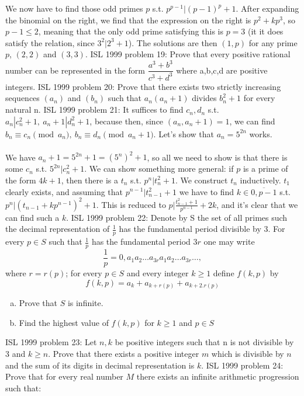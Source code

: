 We now have to find those odd primes $p$ s.t. $p^{p-1}|(p-1)^p+1$. After expanding the binomial on the right, we find that the expression on the right is $p^2+kp^3$, so $p-1\le 2$, meaning that the only odd prime satisfying this is $p=3$ (it it does satisfy the relation, since $3^2|2^3+1$). The solutions are then $(1,p)$ for any prime $p$, $(2,2)$ and $(3,3)$. 
ISL 1999 problem 19:  Prove that every positive rational number can be represented in the form $\dfrac{a^3+b^3}{c^3+d^3}$ where a,b,c,d are positive integers. 
ISL 1999 problem 20:  Prove that there exists two strictly increasing sequences $(a_n)$ and $(b_n)$ such that $a_n(a_n+1)$ divides $b^2_n+1$ for every natural n. 
ISL 1999 problem 21:  It suffices to find $c_n,d_n$ s.t. $a_n|c_n^2+1,\ a_n+1|d_n^2+1$, because then, since $(a_n,a_n+1)=1$, we can find $b_n\equiv c_n\pmod {a_n},\ b_n\equiv d_n\pmod{a_n+1}$. Let's show that $a_n=5^{2n}$ works. \\\\
We have $a_n+1=5^{2n}+1=(5^n)^2+1$, so all we need to show is that there is some $c_n$ s.t. $5^{2n}|c_n^2+1$. We can show something more general: if $p$ is a prime of the form $4k+1$, then there is a $t_n$ s.t. $p^n|t_n^2+1$. We construct $t_n$ inductively. $t_1$ clearly exists, and assuming that $p^{n-1}|t_{n-1}^2+1$ we have to find $k\in\overline{0,p-1}$ s.t. $p^n|(t_{n-1}+kp^{n-1})^2+1$. This is reduced to $p|\frac{t_{n-1}^2+1}{p^{n-1}}+2k$, and it's clear that we can find such a $k$. 
ISL 1999 problem 22:  Denote by S the set of all primes such the decimal representation of $\frac{1}{p}$ has the fundamental period divisible by 3. For every $p \in S$ such that $\frac{1}{p}$ has the fundamental period $3r$ one may write
\[ \frac{1}{p}=0,a_1a_2\ldots a_{3r}a_1a_2 \ldots a_{3r} \ldots , \]
where $r=r(p)$; for every $p \in S$ and every integer $k \geq 1$ define $f(k,p)$ by
\[ f(k,p)= a_k+a_{k+r(p)}+a_{k+2.r(p)} \]
\begin{enumerate}[a)]
  \item Prove that $S$ is infinite.
  \item Find the highest value of $f(k,p)$ for $k \geq 1$ and $p \in S$
\end{enumerate} 
ISL 1999 problem 23:  Let $n,k$ be positive integers such that n is not divisible by 3 and $k \geq n$. Prove that there exists a positive integer $m$ which is divisible by $n$ and the sum of its digits in decimal representation is $k$. 
ISL 1999 problem 24:  Prove that for every real number $M$ there exists an infinite arithmetic progression such that: \\\\
